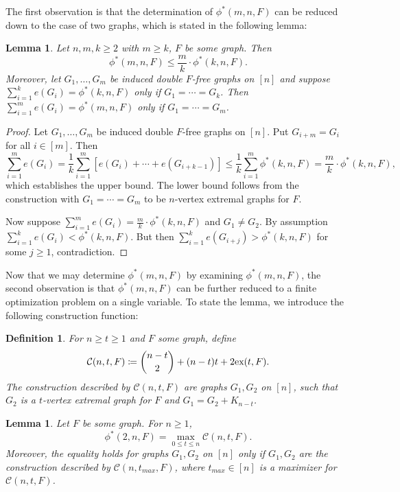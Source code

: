\documentclass[12pt]{article}
\newtheorem{lemma}[theorem]{Lemma}
\newtheorem{definition}[theorem]{Definition}
\newcommand*{\ex}{\textnormal{ex}}
\newcommand*{\con}{\mathcal{C}}
\begin{document}
The first observation is that the determination of $\phi^*(m, n, F)$ can be reduced down to the case of two graphs, which is stated in the following lemma:

\begin{lemma}\label{lem:induce-reduce}
  Let $n, m, k \geq 2$ with $m \geq k$, $F$ be some graph. Then
  \[
    \phi^*(m,n,F) \leq \frac{m}{k} \cdot \phi^*(k, n, F).
  \]
  Moreover, let $G_1, \ldots, G_m$ be induced double $F$-free graphs on $[n]$ and suppose $\sum_{i = 1}^k e(G_i) = \phi^*(k, n, F)$ only if $G_1 = \cdots = G_k$. Then $\sum_{i = 1}^m e(G_i) = \phi^*(m, n, F)$ only if $G_1 = \cdots = G_m$.
\end{lemma}

\begin{proof}
  Let $G_1, \ldots, G_m$ be induced double $F$-free graphs on $[n]$. Put $G_{i + m} = G_i$ for all $i \in [m]$. Then
  \[
    \sum_{i = 1}^m e(G_i) = \frac{1}{k}\sum_{i = 1}^m [e(G_i) + \cdots + e(G_{i + k - 1})] \leq \frac{1}{k}\sum_{i = 1}^m \phi^*(k, n, F) = \frac{m}{k} \cdot \phi^*(k, n, F),
  \]
  which establishes the upper bound. The lower bound follows from the construction with $G_1 = \cdots = G_m$ to be $n$-vertex extremal graphs for $F$.

  Now suppose $\sum_{i = 1}^m e(G_i) = \frac{m}{k} \cdot \phi^*(k, n, F)$ and $G_1 \neq G_2$. By assumption $\sum_{i = 1}^k e(G_i) < \phi^*(k, n, F)$. But then $\sum_{i = 1}^k e(G_{i + j}) > \phi^*(k, n, F)$ for some $j \geq 1$, contradiction. 
\end{proof}

Now that we may determine $\phi^*(m, n, F)$ by examining $\phi^*(m, n, F)$, the second observation is that $\phi^*(m, n, F)$ can be further reduced to a finite optimization problem on a single variable. To state the lemma, we introduce the following construction function: 

\begin{definition}
  For $n \geq t \geq 1$ and $F$ some graph, define 
  \[
    \con(n, t, F) \coloneq \binom{n - t}{2} + (n - t)t + 2\ex(t, F).
  \]
  The construction described by $\con(n, t, F)$ are graphs $G_1, G_2$ on $[n]$, such that $G_2$ is a $t$-vertex extremal graph for $F$ and $G_1 = G_2 + K_{n - t}$. 
\end{definition}

\begin{lemma}\label{lem:optimize-con}
  Let $F$ be some graph. For $n \geq 1$,
  \[
    \phi^*(2, n, F) = \max_{0 \leq t \leq n} \con(n, t, F).
  \]
  Moreover, the equality holds for graphs $G_1, G_2$ on $[n]$ only if $G_1, G_2$ are the construction described by $\con(n, t_{max}, F)$, where $t_{max} \in [n]$ is a maximizer for $\con(n, t, F)$.
\end{lemma}
\end{document}
